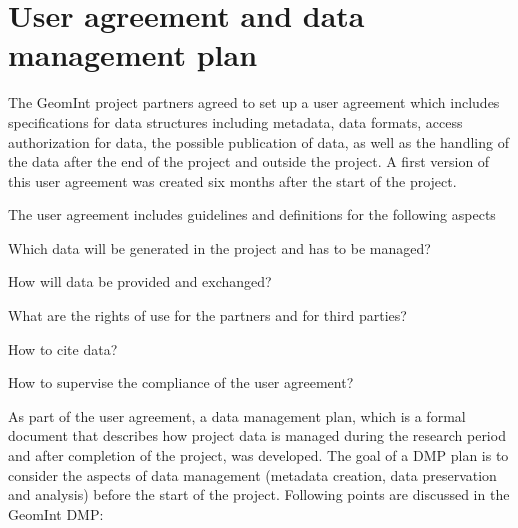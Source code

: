 
\section{User agreement and data management plan}

The GeomInt project partners agreed to set up a user agreement which includes specifications for data structures including metadata, data formats, access authorization for data, the possible publication of data, as well as the handling of the data after the end of the project and outside the project. A first version of this user agreement was created six months after the start of the project. 

The user agreement includes guidelines and definitions for the following aspects 

\begin{list}{-}{\leftmargin=1em \itemindent=0em \itemsep=0.2em}
\item Which data will be generated in the project and has to be managed?
\item How will data be provided and exchanged?
\item What are the rights of use for the partners and for third parties?
\item How to cite data?
\item How to supervise the compliance of the user agreement?
\end{list}

As part of the user agreement, a data management plan, which is a formal document that describes how project data is managed during the research period and after completion of the project, was developed. The goal of a DMP plan is to consider the aspects of data management (metadata creation, data preservation and analysis) before the start of the project. Following points are discussed in the GeomInt DMP:

